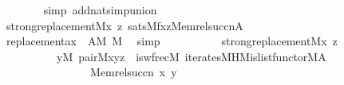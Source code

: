 \begin{isabellebody}
\ \ \ \ \ \ \isamarkupfalse%
\ {\isacharparenleft}{\kern0pt}simp\ add{\isacharcolon}{\kern0pt}nat{\isacharunderscore}{\kern0pt}simp{\isacharunderscore}{\kern0pt}union{\isacharparenright}{\kern0pt}\isanewline
\ \ \ \ \isamarkupfalse%
\isanewline
\ \ \ \ \isamarkupfalse%
\ {\isachardoublequoteopen}strong{\isacharunderscore}{\kern0pt}replacement{\isacharparenleft}{\kern0pt}{\isacharhash}{\kern0pt}{\isacharhash}{\kern0pt}M{\isacharcomma}{\kern0pt}{\isasymlambda}x\ z{\isachardot}{\kern0pt}\ sats{\isacharparenleft}{\kern0pt}M{\isacharcomma}{\kern0pt}{\isacharquery}{\kern0pt}f{\isacharcomma}{\kern0pt}{\isacharbrackleft}{\kern0pt}x{\isacharcomma}{\kern0pt}z{\isacharcomma}{\kern0pt}Memrel{\isacharparenleft}{\kern0pt}succ{\isacharparenleft}{\kern0pt}n{\isacharparenright}{\kern0pt}{\isacharparenright}{\kern0pt}{\isacharcomma}{\kern0pt}A{\isacharcomma}{\kern0pt}{}{\isacharbrackright}{\kern0pt}{\isacharparenright}{\kern0pt}{\isacharparenright}{\kern0pt}{\isachardoublequoteclose}\isanewline
\ \ \ \ \ \ \isamarkupfalse%
\ replacement{\isacharunderscore}{\kern0pt}ax\ {}\ {\isacartoucheopen}A{\isasymin}M{\isacartoucheclose}\ {\isacartoucheopen}{}{\isasymin}M{\isacartoucheclose}\ \isamarkupfalse%
\ simp\isanewline
\ \ \ \ \isamarkupfalse%
\isanewline
\ \ \ \ \isamarkupfalse%
\ {\isachardoublequoteopen}strong{\isacharunderscore}{\kern0pt}replacement{\isacharparenleft}{\kern0pt}{\isacharhash}{\kern0pt}{\isacharhash}{\kern0pt}M{\isacharcomma}{\kern0pt}{\isasymlambda}x\ z{\isachardot}{\kern0pt}\isanewline
\ \ \ \ \ \ \ \ \ \ {\isasymexists}y{\isasymin}M{\isachardot}{\kern0pt}\ pair{\isacharparenleft}{\kern0pt}{\isacharhash}{\kern0pt}{\isacharhash}{\kern0pt}M{\isacharcomma}{\kern0pt}x{\isacharcomma}{\kern0pt}y{\isacharcomma}{\kern0pt}z{\isacharparenright}{\kern0pt}\ {\isacharampersand}{\kern0pt}\ is{\isacharunderscore}{\kern0pt}wfrec{\isacharparenleft}{\kern0pt}{\isacharhash}{\kern0pt}{\isacharhash}{\kern0pt}M{\isacharcomma}{\kern0pt}\ iterates{\isacharunderscore}{\kern0pt}MH{\isacharparenleft}{\kern0pt}{\isacharhash}{\kern0pt}{\isacharhash}{\kern0pt}M{\isacharcomma}{\kern0pt}is{\isacharunderscore}{\kern0pt}list{\isacharunderscore}{\kern0pt}functor{\isacharparenleft}{\kern0pt}{\isacharhash}{\kern0pt}{\isacharhash}{\kern0pt}M{\isacharcomma}{\kern0pt}A{\isacharparenright}{\kern0pt}{\isacharcomma}{\kern0pt}{}{\isacharparenright}{\kern0pt}\ {\isacharcomma}{\kern0pt}\isanewline
\ \ \ \ \ \ \ \ \ \ \ \ \ \ \ \ Memrel{\isacharparenleft}{\kern0pt}succ{\isacharparenleft}{\kern0pt}n{\isacharparenright}{\kern0pt}{\isacharparenright}{\kern0pt}{\isacharcomma}{\kern0pt}\ x{\isacharcomma}{\kern0pt}\ y{\isacharparenright}{\kern0pt}{\isacharparenright}{\kern0pt}{\isachardoublequoteclose}\isanewline

\end{isabellebody}

